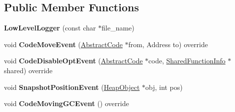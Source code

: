 \subsection*{Public Member Functions}
\begin{DoxyCompactItemize}
\item 
{\bfseries Low\+Level\+Logger} (const char $\ast$file\+\_\+name)\hypertarget{classv8_1_1internal_1_1_low_level_logger_aec5d6b4808216e7df1fac664b54ebf76}{}\label{classv8_1_1internal_1_1_low_level_logger_aec5d6b4808216e7df1fac664b54ebf76}

\item 
void {\bfseries Code\+Move\+Event} (\hyperlink{classv8_1_1internal_1_1_abstract_code}{Abstract\+Code} $\ast$from, Address to) override\hypertarget{classv8_1_1internal_1_1_low_level_logger_a97d9621beb5732fd692b13e85e4946af}{}\label{classv8_1_1internal_1_1_low_level_logger_a97d9621beb5732fd692b13e85e4946af}

\item 
void {\bfseries Code\+Disable\+Opt\+Event} (\hyperlink{classv8_1_1internal_1_1_abstract_code}{Abstract\+Code} $\ast$code, \hyperlink{classv8_1_1internal_1_1_shared_function_info}{Shared\+Function\+Info} $\ast$shared) override\hypertarget{classv8_1_1internal_1_1_low_level_logger_aa861c0ec6bc186eada4a9b6c4d13e935}{}\label{classv8_1_1internal_1_1_low_level_logger_aa861c0ec6bc186eada4a9b6c4d13e935}

\item 
void {\bfseries Snapshot\+Position\+Event} (\hyperlink{classv8_1_1internal_1_1_heap_object}{Heap\+Object} $\ast$obj, int pos)\hypertarget{classv8_1_1internal_1_1_low_level_logger_a006542f9b1b0d8c1e93635fc8d3da4e8}{}\label{classv8_1_1internal_1_1_low_level_logger_a006542f9b1b0d8c1e93635fc8d3da4e8}

\item 
void {\bfseries Code\+Moving\+G\+C\+Event} () override\hypertarget{classv8_1_1internal_1_1_low_level_logger_a202a99cfd523bc4d614322e538a92f89}{}\label{classv8_1_1internal_1_1_low_level_logger_a202a99cfd523bc4d614322e538a92f89}

\end{DoxyCompactItemize}
